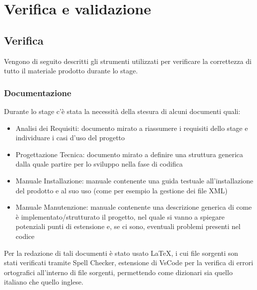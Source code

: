
\chapter{Verifica e validazione}
\label{cap:verifica-validazione}
	\section{Verifica}
		Vengono di seguito descritti gli strumenti utilizzati per verificare la correttezza di tutto il materiale prodotto durante lo stage.
		\subsection{Documentazione}
			Durante lo stage c'è stata la necessità della stesura di alcuni documenti quali:
			\begin{itemize}
				\item Analisi dei Requisiti: documento mirato a riassumere i requisiti dello stage e individuare i casi d'uso del progetto
				\item Progettazione Tecnica: documento mirato a definire una struttura generica dalla quale partire per lo sviluppo nella fase di codifica
				\item Manuale Installazione: manuale contenente una guida testuale all'installazione del prodotto e al suo uso (come per esempio la gestione dei file XML)
				\item Manuale Manutenzione: manuale contenente una descrizione generica di come è implementato/strutturato il progetto, nel quale si vanno a spiegare potenziali punti di estensione e, se ci sono, eventuali problemi  presenti nel codice
			\end{itemize}
			Per la redazione di tali documenti è stato usato \LaTeX, i cui file sorgenti son stati verificati tramite Spell Checker, estensione di VsCode per la verifica di errori ortografici all'interno di file sorgenti, permettendo come dizionari sia quello italiano che quello inglese.\\
			
